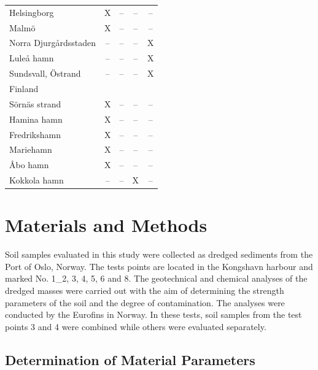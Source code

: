 \documentclass[sustainability,article,accept,pdftex,moreauthors]{Definitions/mdpi}
\begin{document}
\begin{table}[H]
\begin{tabularx}{\textwidth}{m{3cm}<{\centering}CCCC}
Helsingborg & X & -- & -- & -- \\
Malmö & X & -- & -- & -- \\
Norra Djurgårdsstaden & -- & -- & -- & X \\
Luleå hamn & -- & -- & -- & X \\
Sundsvall, Östrand & -- & -- & -- & X \\
\midrule
Finland  &  &  &  &  \\
\midrule
Sörnäs strand & X & -- & -- & -- \\
Hamina hamn & X & -- & -- & -- \\
Fredrikshamn & X & -- & -- & -- \\
Mariehamn & X & -- & -- & -- \\
Åbo hamn & X & -- & -- & -- \\
Kokkola hamn & -- & -- & X & -- \\
\bottomrule
\end{tabularx}
\end{table}

\section{Materials and Methods}

Soil samples {evaluated in this study }were collected as dredged sediments from {the }Port of Oslo, Norway. The tests points are located in {the }Kongshavn harbour and marked No. 1\_2, %
 3, 4, 5, 6 and 8. {The }geotechnical and chemical analyses of the dredged masses were carried out {with the aim }of determining the strength parameters {of the soil }and the degree of contamination. The analyses were conducted by {the }Eurofins in Norway. In these tests, {soil} samples from the test points 3 and 4 were combined while others {were }evaluated separately.

\subsection{Determination of Material Parameters}
\end{document}
